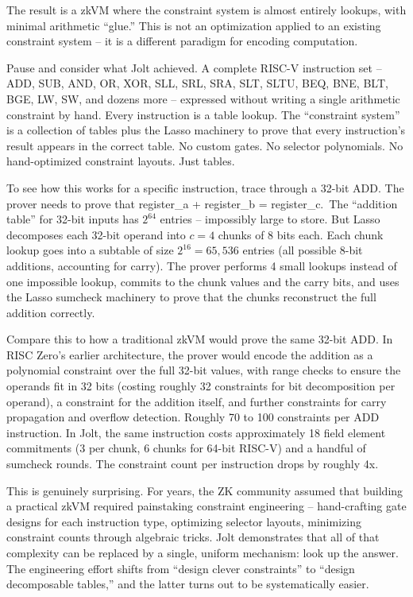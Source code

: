 \documentclass[
  11pt,
  openany]{report}
\begin{document}
The result is a zkVM where the constraint system is almost entirely lookups,
with minimal arithmetic ``glue.'' This is not an optimization applied to an
existing constraint system -- it is a different paradigm for encoding
computation.

Pause and consider what Jolt achieved. A complete RISC-V instruction set -- ADD,
SUB, AND, OR, XOR, SLL, SRL, SRA, SLT, SLTU, BEQ, BNE, BLT, BGE, LW, SW, and
dozens more -- expressed without writing a single arithmetic constraint by hand.
Every instruction is a table lookup. The ``constraint system'' is a collection
of tables plus the Lasso machinery to prove that every instruction's result
appears in the correct table. No custom gates. No selector polynomials. No
hand-optimized constraint layouts. Just tables.

To see how this works for a specific instruction, trace through a 32-bit ADD.
The prover needs to prove that register\_a + register\_b = register\_c.~The
``addition table'' for 32-bit inputs has \(2^{64}\) entries -- impossibly large
to store. But Lasso decomposes each 32-bit operand into \(c = 4\) chunks of 8
bits each. Each chunk lookup goes into a subtable of size \(2^{16} = 65{,}536\)
entries (all possible 8-bit additions, accounting for carry). The prover
performs 4 small lookups instead of one impossible lookup, commits to the chunk
values and the carry bits, and uses the Lasso sumcheck machinery to prove that
the chunks reconstruct the full addition correctly.

Compare this to how a traditional zkVM would prove the same 32-bit ADD. In RISC
Zero's earlier architecture, the prover would encode the addition as a
polynomial constraint over the full 32-bit values, with range checks to ensure
the operands fit in 32 bits (costing roughly 32 constraints for bit
decomposition per operand), a constraint for the addition itself, and further
constraints for carry propagation and overflow detection. Roughly 70 to 100
constraints per ADD instruction. In Jolt, the same instruction costs
approximately 18 field element commitments (3 per chunk, 6 chunks for 64-bit
RISC-V) and a handful of sumcheck rounds. The constraint count per instruction
drops by roughly 4x.

This is genuinely surprising. For years, the ZK community assumed that building
a practical zkVM required painstaking constraint engineering -- hand-crafting
gate designs for each instruction type, optimizing selector layouts, minimizing
constraint counts through algebraic tricks. Jolt demonstrates that all of that
complexity can be replaced by a single, uniform mechanism: look up the answer.
The engineering effort shifts from ``design clever constraints'' to ``design
decomposable tables,'' and the latter turns out to be systematically easier.
\end{document}
